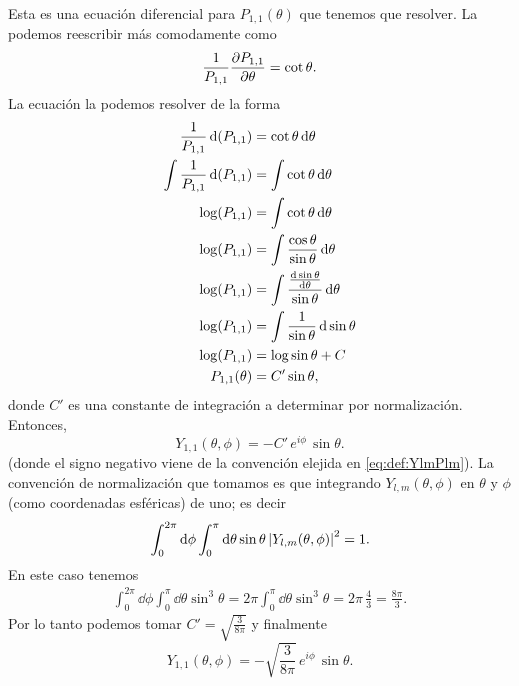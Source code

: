 \documentclass[10pt, a4paper]{article}
\newcommand{\Ylm}{Y_{l,m}}
\newcommand{\Ylmev}[2]{Y_{#1,#2}}
\newcommand{\Plmev}[2]{P_{#1,#2}}
\numberwithin{equation}{subsection}
\begin{document}
Esta es una ecuación diferencial para $\Plmev{1}{1}(\theta)$ que tenemos
que resolver. La podemos reescribir más comodamente como
\begin{equation}
  \frac{1}{\Plmev{1}{1}}\pdv{\Plmev{1}{1}}{\theta}
    = \cot\theta.
\end{equation}
La ecuación la podemos resolver de la forma
\begin{align}
  \frac{1}{\Plmev{1}{1}}\dd(\Plmev{1}{1})
    &= \cot\theta \dd{\theta} \nonumber \\
  \int\frac{1}{\Plmev{1}{1}}\dd(\Plmev{1}{1})
    &= \int\cot\theta \dd{\theta} \nonumber \\
  \log(\Plmev{1}{1})
    &= \int\cot\theta \dd{\theta} \nonumber \\
  \log(\Plmev{1}{1})
    &= \int\frac{\cos\theta}{\sin\theta} \dd{\theta} \nonumber \\
  \log(\Plmev{1}{1})
    &= \int\frac{\dv{\sin\theta}{\theta}}{\sin\theta} \dd{\theta} \nonumber \\
  \log(\Plmev{1}{1})
    &= \int\frac{1}{\sin\theta} \dd{\sin\theta} \nonumber \\
  \log(\Plmev{1}{1})
    &= \log\sin\theta + C \nonumber \\
  \Plmev{1}{1}(\theta)
    &= C'\sin\theta,
\end{align}
donde $C'$ es una constante de integración a determinar por normalización.
Entonces,
\begin{equation}
  \Ylmev{1}{1}(\theta,\phi) = -C'\,e^{i\phi}\,\sin\theta.
\end{equation}
(donde el signo negativo viene de la convención elejida en
\eqref{eq:def:YlmPlm}).
La convención de normalización que tomamos es que integrando
$\Ylm(\theta,\phi)$ en $\theta$ y $\phi$ (como coordenadas esféricas) de uno;
es decir
\begin{equation}
  \int_{0}^{2\pi}\dd{\phi}
    \int_{0}^{\pi}\dd{\theta}\sin\theta\,\abs{\Ylm(\theta,\phi)}^2
    = 1.
\end{equation}
En este caso tenemos
\begin{align}
  \int_{0}^{2\pi}\dd{\phi}\int_{0}^{\pi}\dd{\theta}\sin^3\theta =
  2\pi\int_{0}^{\pi}\dd{\theta}\sin^3\theta = 2\pi\,\frac{4}{3} =
  \frac{8\pi}{3}.
\end{align}
Por lo tanto podemos tomar $C'= \sqrt{\frac{3}{8\pi}}$ y finalmente
\begin{equation}
  \Ylmev{1}{1}(\theta,\phi) = -\sqrt{\frac{3}{8\pi}}\,e^{i\phi}\,\sin\theta.
\end{equation}
\end{document}

